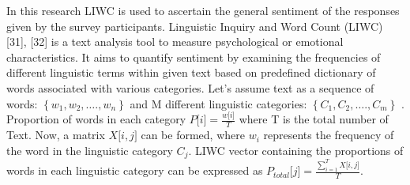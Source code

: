 \documentclass[sn-mathphys,Numbered]{sn-jnl}%
\theoremstyle{thmstyleone}%
\theoremstyle{thmstyletwo}%
\theoremstyle{thmstylethree}%
\begin{document}
In this research LIWC is used to ascertain the general sentiment of the
responses given by the survey participants. Linguistic Inquiry and Word
Count (LIWC) {[}31{]}, {[}32{]} is a text analysis tool to measure
psychological or emotional characteristics. It aims to quantify
sentiment by examining the frequencies of different linguistic terms
within given text based on predefined dictionary of words associated
with various categories. Let's assume text as a sequence of words:
\(\left\{ w_{1},w_{2},\ldots.,w_{n} \right\}\) and M different
linguistic categories: \(\left\{ C_{1},C_{2},\ldots.,C_{m} \right\}\) .
Proportion of words in each category
\(P\lbrack i\rbrack = \frac{w\lbrack i\rbrack}{T}\) where T is the total
number of Text. Now, a matrix \(X\lbrack i,j\rbrack\) can be formed,
where \(w_{i}\) represents the frequency of the word in the linguistic
category \(C_{j}\). LIWC vector containing the proportions of words in
each linguistic category can be expressed as
\(P_{total}\lbrack j\rbrack = \frac{\sum_{i = 1}^{T}{X\lbrack i,j\rbrack}}{T}\).
\end{document}
